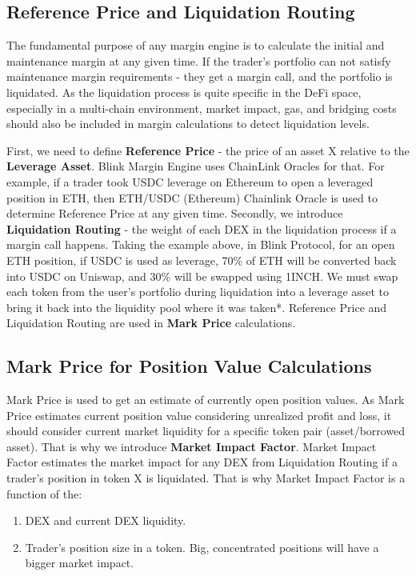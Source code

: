 \documentclass[conference]{IEEEtran}
\begin{document}
\subsection{Reference Price and Liquidation Routing}
The fundamental purpose of any margin engine is to calculate the initial and maintenance margin at any given time. If the trader's portfolio can not satisfy maintenance margin requirements -  they get a margin call, and the portfolio is liquidated. As the liquidation process is quite specific in the DeFi space, especially in a multi-chain environment, market impact, gas, and bridging costs should also be included in margin calculations to detect liquidation levels.

First, we need to define \textbf {Reference Price} - the price of an asset X relative to the \textbf{Leverage Asset}. Blink Margin Engine uses ChainLink Oracles for that. For example, if a trader took USDC leverage on Ethereum to open a leveraged position in ETH, then ETH/USDC (Ethereum) Chainlink Oracle is used to determine Reference Price at any given time. Secondly, we introduce \textbf {Liquidation Routing} - the weight of each DEX in the liquidation process if a margin call happens. Taking the example above, in Blink Protocol, for an open ETH position, if USDC is used as leverage, 70\% of ETH will be converted back into USDC on Uniswap, and 30\% will be swapped using 1INCH. We must swap each token from the user's portfolio during liquidation into a leverage asset to bring it back into the liquidity pool where it was taken*. Reference Price and Liquidation Routing are used in \textbf{Mark Price} calculations.

\thispagestyle{fancy}

\subsection{Mark Price for Position Value Calculations}

Mark Price is used to get an estimate of currently open position values. As Mark Price estimates current position value considering unrealized profit and loss, it should consider current market liquidity for a specific token pair (asset/borrowed asset). That is why we introduce \textbf{Market Impact Factor}. Market Impact Factor estimates the market impact for any DEX from Liquidation Routing if a trader's position in token X is liquidated. That is why Market Impact Factor is a function of the:
  \begin{enumerate}
  \item DEX and current DEX liquidity.
  \item Trader's position size in a token. Big, concentrated positions will have a bigger market impact. 	
  \end{enumerate}
\end{document}

